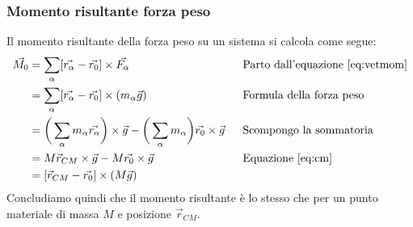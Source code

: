 \subsubsection{Momento risultante forza peso}
Il momento risultante della forza peso su un sistema si calcola come segue:
\begin{equation}
	\begin{alignedat}{2}
		\vec{M_0} & = \sum_\alpha[\vec{r_\alpha}-\vec{r_0}] \times \vec{F_\alpha} \qquad\qquad\qquad\qquad\qquad && \text{Parto dall'equazione \ref{eq:vetmom}} \\
		& = \sum_\alpha[\vec{r_\alpha}-\vec{r_0}] \times (m_\alpha \vec{g}) && \text{Formula della forza peso} \\
		& = \bigg(\sum_\alpha m_\alpha \vec{r_\alpha}\bigg) \times \vec{g} - \bigg(\sum_\alpha m_\alpha\bigg)\vec{r_0}\times \vec{g} && \text{Scompongo la sommatoria} \\
		& = M \vec{r}_{CM} \times \vec{g} - M \vec{r_0} \times \vec{g} && \text{Equazione \ref{eq:cm}} \\
		& = [\vec{r}_{CM}-\vec{r_0}] \times (M\vec{g})
	\end{alignedat}
\end{equation}
Concludiamo quindi che il momento risultante è lo stesso che per un punto materiale di massa $M$ e posizione $\vec{r}_{CM}$.

